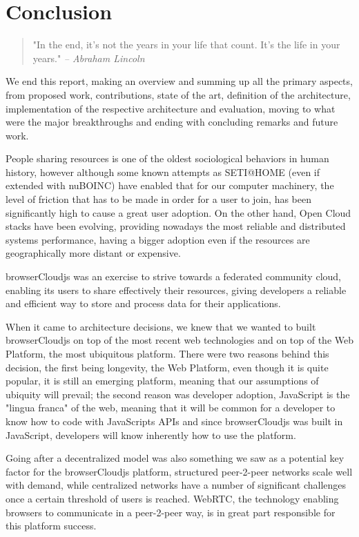 \chapter{Conclusion}\label{ch:conclusion}

\begin{quotation}
  "In the end, it's not the years in your life that count. It's the life in your years."
  {\small\it -- Abraham Lincoln}
\end{quotation}

We end this report, making an overview and summing up all the primary aspects, from proposed work, contributions, state of the art, definition of the architecture, implementation of the respective architecture and evaluation, moving to what were the major breakthroughs and ending with concluding remarks and future work.

People sharing resources is one of the oldest sociological behaviors in human history, however although some known attempts as SETI@HOME (even if extended with nuBOINC) have enabled that for our computer machinery, the level of friction that has to be made in order for a user to join, has been significantly high to cause a great user adoption. On the other hand, Open Cloud stacks have been evolving, providing nowadays the most reliable and distributed systems performance, having a bigger adoption even if the resources are geographically more distant or expensive.

browserCloudjs was an exercise to strive towards a federated community cloud, enabling its users to share effectively their resources, giving developers a reliable and efficient way to store and process data for their applications.

When it came to architecture decisions, we knew that we wanted to built browserCloudjs on top of the most recent web technologies and on top of the Web Platform, the most ubiquitous platform. There were two reasons behind this decision, the first being longevity, the Web Platform, even though it is quite popular, it is still an emerging platform, meaning that our assumptions of ubiquity will prevail; the second reason was developer adoption, JavaScript is the "lingua franca" of the web, meaning that it will be common for a developer to know how to code with JavaScripts APIs and since browserCloudjs was built in JavaScript, developers will know inherently how to use the platform.

Going after a decentralized model was also something we saw as a potential key factor for the browserCloudjs platform, structured peer-2-peer networks scale well with demand, while centralized networks have a number of significant challenges once a certain threshold of users is reached. WebRTC, the technology enabling browsers to communicate in a peer-2-peer way, is in great part responsible for this platform success.

